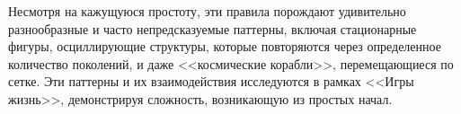 Несмотря на кажущуюся простоту, эти правила порождают удивительно разнообразные и часто непредсказуемые паттерны, включая стационарные фигуры, осциллирующие структуры, которые повторяются через определенное количество поколений, и даже <<космические корабли>>, перемещающиеся по сетке. Эти паттерны и их взаимодействия исследуются в рамках <<Игры жизнь>>, демонстрируя сложность, возникающую из простых начал.


